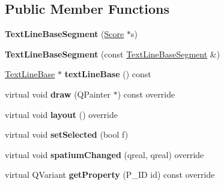 \subsection*{Public Member Functions}
\begin{DoxyCompactItemize}
\item 
\mbox{\label{class_ms_1_1_text_line_base_segment_ac7be1ea2f204be8aaf844182929dda67}} 
{\bfseries Text\+Line\+Base\+Segment} (\hyperlink{class_ms_1_1_score}{Score} $\ast$s)
\item 
\mbox{\label{class_ms_1_1_text_line_base_segment_a205796a77bd61c4b700fd37ede7d4480}} 
{\bfseries Text\+Line\+Base\+Segment} (const \hyperlink{class_ms_1_1_text_line_base_segment}{Text\+Line\+Base\+Segment} \&)
\item 
\mbox{\label{class_ms_1_1_text_line_base_segment_ab9550e424f61ca56faece62cdbc05557}} 
\hyperlink{class_ms_1_1_text_line_base}{Text\+Line\+Base} $\ast$ {\bfseries text\+Line\+Base} () const
\item 
\mbox{\label{class_ms_1_1_text_line_base_segment_af9570ca2417167aa6956b5bc53457f13}} 
virtual void {\bfseries draw} (Q\+Painter $\ast$) const override
\item 
\mbox{\label{class_ms_1_1_text_line_base_segment_a2605b73eae89cb6d7d62ae539c8302dc}} 
virtual void {\bfseries layout} () override
\item 
\mbox{\label{class_ms_1_1_text_line_base_segment_a14bcda5c00267382041417424c4b2e46}} 
virtual void {\bfseries set\+Selected} (bool f)
\item 
\mbox{\label{class_ms_1_1_text_line_base_segment_ab60e4be0176a57099d8132a224f48d47}} 
virtual void {\bfseries spatium\+Changed} (qreal, qreal) override
\item 
\mbox{\label{class_ms_1_1_text_line_base_segment_a3e8879c683efb9598a155dc195d2b6f4}} 
virtual Q\+Variant {\bfseries get\+Property} (P\+\_\+\+ID id) const override

\end{DoxyCompactItemize}
